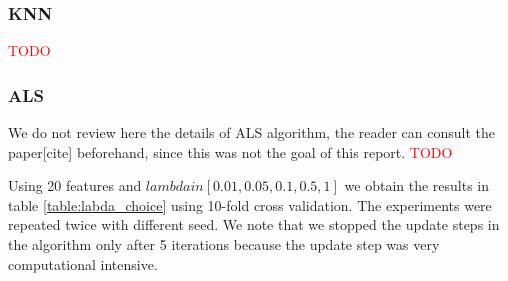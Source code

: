 \subsubsection{KNN}
\textcolor{red}{TODO}


\subsubsection{ALS}
We do not review here the details of ALS algorithm, the reader can consult the paper[cite] beforehand, since this was not the goal of this report.
\textcolor{red}{TODO}

Using 20 features and $lambda in [0.01,0.05,0.1,0.5,1]$ we obtain the results in table \ref{table:labda_choice} using 10-fold cross validation. The experiments were repeated twice with different seed. We note that we stopped the update steps in the algorithm only after 5 iterations because the update step was very computational intensive.

